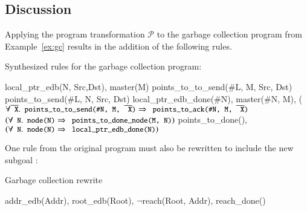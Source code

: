 

\subsection{Discussion}
Applying the program transformation $\mathcal{P}$ to the garbage collection program from Example~\ref{ex:gc} results in the addition of the following rules.

\begin{example}
Synthesized rules for the garbage collection program:

\begin{Drules}
        {local_ptr_edb(N, Src,Dst), master(M)}
        {points_to_to_send(#L, M, Src, Dst)}
        {points_to_send(#L, N, Src, Dst)}
        {local_ptr_edb_done(#N), master(#N, M), (\(\forall \od{X}.\dedalus{points_to_to_send(#N, M, \od{X})} \Rightarrow \dedalus{points_to_ack(#N, M, \od{X})}\)}
        {\(\left(\forall \dedalus{N}.\dedalus{node(N)} \Rightarrow \dedalus{points_to_done_node(M, N)}\right)\)}
        {points_to_done(), \(\left(\forall \dedalus{N}.\dedalus{node(N)} \Rightarrow \dedalus{local_ptr_edb_done(N)}\right)\)}
\end{Drules}
\end{example}

One rule from the original program must also be rewritten to include the
new subgoal :

\begin{example}
Garbage collection rewrite

\begin{Drules}
        {addr_edb(Addr), root_edb(Root), $\lnot$reach(Root, Addr), reach_done()}
\end{Drules}
\end{example}

